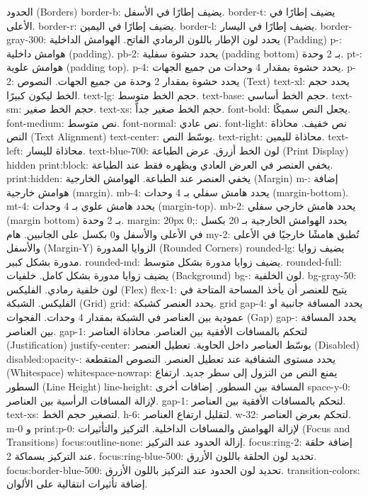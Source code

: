     الحدود (Borders)
    border-b: يضيف إطارًا في الأسفل.
    border-t: يضيف إطارًا في الأعلى.
    border-r: يضيف إطارًا في اليمين.
    border-l: يضيف إطارًا في اليسار.
    border-gray-300: يحدد لون الإطار باللون الرمادي الفاتح.
    الهوامش الداخلية (Padding)
    p-: هوامش داخلية (padding).
    pb-2: يحدد حشوة سفلية (padding bottom) بـ 2 وحدة.
    pt-: هوامش علوية (padding top).
    p-4: يحدد حشوة بمقدار 4 وحدات من جميع الجهات.
    p-2: يحدد حشوة بمقدار 2 وحدة من جميع الجهات.
    النصوص (Text)
    text-xl: يحدد حجم الخط ليكون كبيرًا.
    text-lg: حجم الخط متوسط.
    text-base: حجم الخط أساسي.
    text-sm: حجم الخط صغير.
    text-xs: حجم الخط صغير جداً.
    font-bold: يجعل النص سميكًا.
    font-medium: نص متوسط.
    font-normal: نص عادي.
    font-light: نص خفيف.
    محاذاة النص (Text Alignment)
    text-center: يوسّط النص.
    text-right: محاذاة لليمين.
    text-left: محاذاة لليسار.
    text-blue-700: لون الخط أزرق.
    عرض الطباعة (Print Display)
    hidden print:block: يخفي العنصر في العرض العادي ويظهره فقط عند الطباعة.
    print:hidden: يخفي العنصر عند الطباعة.
    الهوامش الخارجية (Margin)
    m-: إضافة هوامش خارجية (margin).
    mb-4: يحدد هامش سفلي بـ 4 وحدات (margin-bottom).
    mt-4: يحدد هامش علوي بـ 4 وحدات (margin-top).
    mb-2: يحدد هامش خارجي سفلي (margin bottom) بـ 2 وحدة.
    margin: 20px 0;: يحدد الهوامش الخارجية بـ 20 بكسل في الأعلى والأسفل و0 بكسل على الجانبين.
    هام
    my-2:  تُطبق هامشًا خارجيًا في الأعلى والأسفل (Margin-Y)
    الزوايا المدورة (Rounded Corners)
    rounded-lg: يضيف زوايا مدورة بشكل كبير.
    rounded-md: يضيف زوايا مدورة بشكل متوسط.
    rounded-full: يضيف زوايا مدورة بشكل كامل.
    خلفيات (Background)
    bg-: لون الخلفية.
    bg-gray-50: لون خلفية رمادي.
    الفليكس (Flex)
    flex-1: يتيح للعنصر أن يأخذ المساحة المتاحة في الفليكس.
    الشبكة (Grid)
    grid: يحدد العنصر كشبكة.
    grid gap-4: يحدد المسافة جانبية او عمودية بين العناصر في الشبكة بمقدار 4 وحدات. 
    الفجوات (Gap)
    gap-: يحدد المسافة بين العناصر.
    gap-1: لتحكم بالمسافات الأفقية بين العناصر.
    محاذاة العناصر (Justification)
    justify-center: يوسّط العناصر داخل الحاوية.
    تعطيل العنصر (Disabled)
    disabled:opacity-: يحدد مستوى الشفافية عند تعطيل العنصر.
    النصوص المتقطعة (Whitespace)
    whitespace-nowrap: يمنع النص من النزول إلى سطر جديد.
    ارتفاع السطور (Line Height)
    line-height: المسافة بين السطور.
    إضافات أخرى
    space-y-0: لإزالة المسافات الرأسية بين العناصر.
    gap-1: لتحكم بالمسافات الأفقية بين العناصر.
    text-xs: لتصغير حجم الخط.
    h-6: لتقليل ارتفاع العناصر.
    w-32: لتحكم بعرض العناصر.
    m-0 و print:p-0: لإزالة الهوامش والمسافات الداخلية.
    التركيز والتأثيرات (Focus and Transitions)
    focus:outline-none: إزالة الحدود عند التركيز.
    focus:ring-2: إضافة حلقة عند التركيز بسماكة 2.
    focus:ring-blue-500: تحديد لون الحلقة باللون الأزرق.
    focus:border-blue-500: تحديد لون الحدود عند التركيز باللون الأزرق.
    transition-colors: إضافة تأثيرات انتقالية على الألوان.


